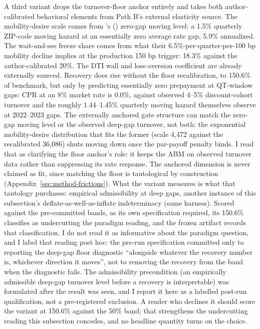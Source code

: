 \documentclass[12pt]{article}
\newcommand{\citepos}[1]{\citeauthor{#1}'s (\citeyear{#1})}
\begin{document}
A third variant drops the turnover-floor anchor entirely and takes both author-calibrated behavioral elements from Path B's external elasticity source. The mobility-desire scale comes from \citepos{liebersohn2024} zero-gap moving level: a 1.5\% quarterly ZIP-code moving hazard at an essentially zero average rate gap, 5.9\% annualized. The wait-and-see freeze share comes from what their 6.5\%-per-quarter-per-100 bp mobility decline implies at the production 150 bp trigger: 18.3\% against the author-calibrated 20\%. The DTI wall and loss-aversion coefficient are already externally sourced. Recovery does rise without the floor recalibration, to 150.6\% of benchmark, but only by predicting essentially zero prepayment at QT-window gaps: CPR at an 8\% market rate is 0.0\%, against observed 4--5\% discount-cohort turnover and the roughly 1.44--1.45\% quarterly moving hazard \citet{liebersohn2024} themselves observe at 2022--2023 gaps. The externally anchored gate structure can match the zero-gap moving level or the observed deep-gap turnover, not both: the exponential mobility-desire distribution that fits the former (scale 4{,}472 against the recalibrated 36{,}086) shuts moving down once the par-payoff penalty binds. I read that as clarifying the floor anchor's role: it keeps the ABM on observed turnover data rather than suppressing its rate response. The anchored dimension is never claimed as fit, since matching the floor is tautological by construction (Appendix~\ref{sec:method-frictions}). What the variant measures is what that tautology purchases: empirical admissibility at deep gaps, another instance of this subsection's deflate-as-well-as-inflate indeterminacy (same harness). Scored against the pre-committed bands, as its own specification required, its 150.6\% classifies as undercutting the paradigm reading, and the frozen artifact records that classification. I do not read it as informative about the paradigm question, and I label that reading post hoc: the pre-run specification committed only to reporting the deep-gap floor diagnostic ``alongside whatever the recovery number is, whichever direction it moves'', not to removing the recovery from the band when the diagnostic fails. The admissibility precondition (an empirically admissible deep-gap turnover level before a recovery is interpretable) was formulated after the result was seen, and I report it here as a labelled post-run qualification, not a pre-registered exclusion. A reader who declines it should score the variant at 150.6\% against the 50\% band; that strengthens the undercutting reading this subsection concedes, and no headline quantity turns on the choice.
\end{document}
